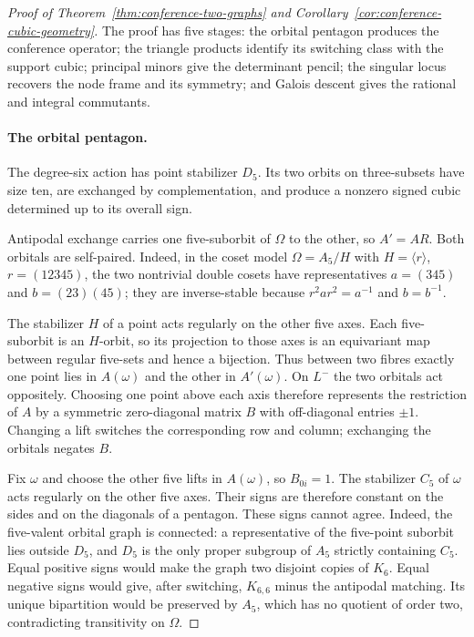 \documentclass[11pt]{article}
\theoremstyle{definition}
\theoremstyle{remark}
\begin{document}
\begin{proof}[Proof of Theorem~\ref{thm:conference-two-graphs} and
Corollary~\ref{cor:conference-cubic-geometry}]
The proof has five stages: the orbital pentagon produces the conference operator;
the triangle products identify its switching class with the support cubic;
principal minors give the determinant pencil; the singular locus recovers
the node frame and its symmetry; and Galois descent gives the rational and
integral commutants.

\paragraph{The orbital pentagon.}
The degree-six action has point stabilizer $D_5$.  Its two orbits on
three-subsets have size ten, are exchanged by complementation, and produce
a nonzero signed cubic determined up to its overall sign.

Antipodal exchange carries one five-suborbit of $\Omega$ to the other, so
$A'=AR$. Both orbitals are self-paired. Indeed, in the coset model
$\Omega=A_5/H$ with $H=\langle r\rangle$, $r=(12345)$, the two nontrivial
double cosets have representatives $a=(345)$ and $b=(23)(45)$; they are
inverse-stable because $r^2ar^2=a^{-1}$ and $b=b^{-1}$.

The stabilizer $H$ of a point acts regularly on the other five axes. Each
five-suborbit is an $H$-orbit, so its projection to those axes is an
equivariant map between regular five-sets and hence a bijection. Thus between
two fibres exactly one point lies in $A(\omega)$ and the other in
$A'(\omega)$. On $L^-$ the two orbitals act oppositely. Choosing one point
above each axis therefore represents the restriction of $A$ by a symmetric
zero-diagonal matrix $B$ with off-diagonal entries $\pm1$. Changing a lift
switches the corresponding row and column; exchanging the orbitals negates
$B$.

Fix $\omega$ and choose the other five lifts in $A(\omega)$, so
$B_{0i}=1$. The stabilizer $C_5$ of $\omega$ acts regularly on the other
five axes. Their signs are therefore constant on the sides and on the
diagonals of a pentagon. These signs cannot agree. Indeed, the five-valent
orbital graph is connected: a representative of the five-point suborbit
lies outside $D_5$, and $D_5$ is the only proper subgroup of $A_5$
strictly containing $C_5$. Equal positive signs would make the graph two
disjoint copies of $K_6$. Equal negative signs would give, after switching,
$K_{6,6}$ minus the antipodal matching. Its unique bipartition would be
preserved by $A_5$, which has no quotient of order two, contradicting
transitivity on $\Omega$.


\end{proof}
\end{document}
